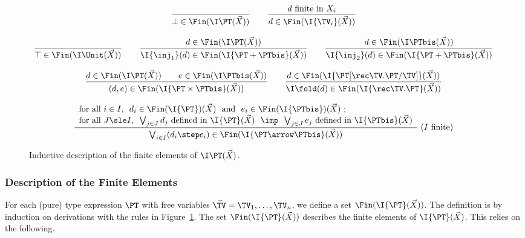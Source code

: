 \begin{figure}[t!]
\centering
\(
\begin{array}{c}
%
\dfrac{}
  {\bot \in \Fin(\I\PT(\vec X))}  
%
\qquad
%
\dfrac{\text{$d$ finite in $X_i$}}
  {d \in \Fin(\I{\TV_i}(\vec X))}
%
\\\\
%
\dfrac{}
  {\top \in \Fin(\I\Unit(\vec X))}
%
\qquad
%
\dfrac{d \in \Fin(\I\PT(\vec X))}
  {\I{\inj_1}(d) \in \Fin(\I{\PT + \PTbis}(\vec X))}
%
\qquad
%
\dfrac{d \in \Fin(\I\PTbis(\vec X))}
  {\I{\inj_2}(d) \in \Fin(\I{\PT + \PTbis}(\vec X))}
%
\\\\
%
\dfrac{d \in \Fin(\I\PT(\vec X))
  \qquad
  e \in \Fin(\I\PTbis(\vec X))}
  {(d,e) \in \Fin(\I{\PT \times \PTbis}(\vec X))}
%
\qquad
%
\dfrac{d \in \Fin(\I{\PT[\rec\TV.\PT/\TV]}(\vec X))}
  {\I\fold(d) \in \Fin(\I{\rec\TV.\PT}(\vec X))}
%
\\\\
%
\dfrac{\begin{array}{l}
  \text{for all $i \in I$,~
  $d_i \in \Fin(\I{\PT})(\vec X)$
  ~and~
  $e_i \in \Fin(\I{\PTbis})(\vec X)$ \@;}
  \\
  \text{for all $J \sle I$,~
  $\bigvee_{j \in J} d_j$ defined in $\I{\PT}(\vec X)$
  ~$\imp$~
  $\bigvee_{j \in J} e_j$ defined in $\I{\PTbis}(\vec X)$}
  \end{array}}
  {\bigvee_{i \in I}(d_i \step e_i) \in \Fin(\I{\PT \arrow \PTbis}(\vec X))}
~(\text{$I$ finite})
%
\end{array}
\)
\caption{Inductive description of the finite elements of $\I\PT(\vec X)$.%
\label{fig:proof:sem:finelt}}
\end{figure}

\subsubsection{Description of the Finite Elements}
\label{sec:proof:sem:pure:finite}

For each (pure) type expression $\PT$
with free variables $\vec\TV = \TV_1,\dots,\TV_n$,
we define a set $\Fin(\I{\PT}(\vec X))$.
The definition is by induction on derivations with
the rules in Figure~\ref{fig:proof:sem:finelt}.
The set $\Fin(\I{\PT}(\vec X))$
describes the finite elements of $\I{\PT}(\vec X)$.
This relies on the following.

